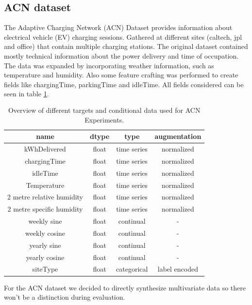 \subsection*{ACN dataset}
\label{subsec:ACN}
The Adaptive Charging Network (ACN) Dataset \cite{ACNsource} provides information about electrical vehicle (EV) charging sessions. Gathered at different sites (caltech, jpl and office) that contain multiple charging stations.
The original dataset contained mostly technical information about the power delivery and time of occupation. The data was expanded by incorporating weather information, such as temperature and humidity. Also some feature crafting was performed to 
create fields like chargingTime, parkingTime and idleTime. All fields considered can be seen in table \ref{table:acn params}.
\begin{table}[h!]
    \centering
    \begin{tabular}{|c c c c|} 
         \hline
         name & dtype & type  & augmentation\\ [0.5ex] 
         \hline\hline
         kWhDelivered & float & time series  & normalized\\ 
         \hline
         chargingTime & float & time series  & normalized\\ 
         \hline
         idleTime & float & time series   & normalized\\ 
         \hline
         Temperature & float & time series   & normalized\\ 
         \hline
         2 metre relative humidity & float & time series   & normalized\\ 
         \hline
         2 metre specific humidity & float & time series   & normalized\\ 
         \hline
         weekly sine & float & continual   & -\\ 
         \hline
         weekly cosine & float & continual   & -\\ 
         \hline
         yearly sine & float & continual   & -\\ 
         \hline
         yearly cosine & float & continual   & -\\ 
         \hline
         siteType & float & categorical   & label encoded\\ 
         \hline
        \end{tabular}
    \caption{Overview of different targets and conditional data used for ACN Experiments.}
    \label{table:acn params}
\end{table}
For the ACN dataset we decided to directly synthesize multivariate data so there won't be a distinction during evaluation.
